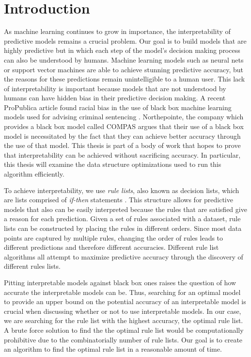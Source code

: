 \chapter{Introduction}
\label{introduction}

As machine learning continues to grow in importance, the interpretability of predictive models remains a crucial problem.
Our goal is to build models that are highly predictive but in which each step of the model's decision making process can also be understood by humans.
Machine learning models such as neural nets or support vector machines are able to achieve stunning predictive accuracy, but the reasons for these predictions remain unintelligible to a human user.
This lack of interpretability is important because models that are not understood by humans can have hidden bias in their predictive decision making.
A recent ProPublica article found racial bias in the use of black box machine learning models used for advising criminal sentencing \cite{LarsonMaKiAn16}.
Northepointe, the company which provides a black box model called COMPAS argues that their use of a black box model is necessitated by the fact that they can achieve better accuracy through the use of that model.
This thesis is part of a body of work that hopes to prove that interpretability can be achieved without sacrificing accuracy.
In particular, this thesis will examine the data structure optimizations used to run this algorithm efficiently.

To achieve interpretability, we use \emph{rule lists}, also known as decision lists, which are lists comprised of \emph{if-then} statements \cite{Rivest87}. 
This structure allows for predictive models that also can be easily interpreted because the rules that are satisfied give a reason for each prediction. 
Given a set of rules associated with a dataset, rule lists can be constructed by placing the rules in different orders.
Since most data points are captured by multiple rules, changing the order of rules leads to different predictions and therefore different accuracies. 
Different rule list algorithms all attempt to maximize predictive accuracy through the discovery of different rules lists.

Pitting interpretable models against black box ones raises the question of how accurate the interpretable models can be.
Thus, searching for an optimal model to provide an upper bound on the potential accuracy of an interpretable model is crucial when discussing whether or not to use interpretable models.
In our case, we are searching for the  rule list with the highest accuracy, the optimal rule list. 
A brute force solution to find the the optimal rule list would be computationally prohibitive due to the combinatorially number of rule lists.
Our goal is to create an algorithm to find the optimal rule list in a reasonable amount of time.

